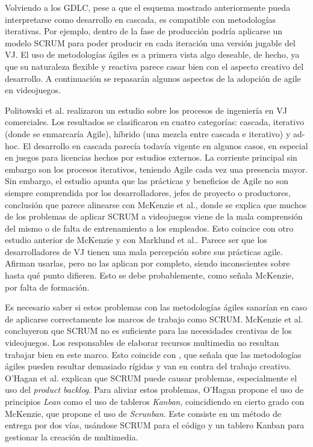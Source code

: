 Volviendo a los GDLC, pese a que el esquema mostrado anteriormente pueda interpretarse como desarrollo en cascada, es compatible con metodologías iterativas. Por ejemplo, dentro de la fase de producción podría aplicarse un modelo SCRUM para poder producir en cada iteración una versión jugable del VJ. El uso de metodologías ágiles es a primera vista algo deseable, de hecho, ya que su naturaleza flexible y reactiva parece casar bien con el aspecto creativo del desarrollo. A continuación se repasarán algunos aspectos de la adopción de agile en videojuegos.

Politowski et al.\cite{politowski} realizaron un estudio sobre los procesos de ingeniería en VJ comerciales. Los resultados se clasificaron en cuatro categorías: cascada, iterativo (donde se enmarcaría Agile), híbrido (una mezcla entre cascada e iterativo) y ad-hoc. El desarrollo en cascada parecía todavía vigente en algunos casos, en especial en juegos para licencias hechos por estudios externos. La corriente principal sin embargo son los procesos iterativos, teniendo Agile cada vez una presencia mayor. Sin embargo, el estudio apunta que las prácticas y beneficios de Agile no son siempre comprendida por los desarrolladores, jefes de proyecto o productores, conclusión que parece alinearse con McKenzie et al.\cite{mckenzie}, donde se explica que muchos de los problemas de aplicar SCRUM a videojuegos viene de la mala comprensión del mismo o de falta de entrenamiento a los empleados. Esto coincice con otro estudio anterior de McKenzie\cite{mckenzie2} y con Marklund et al.\cite{marklund}. Parece ser que los desarrolladores de VJ tienen una mala percepción sobre sus prácticas agile. Afirman usarlas, pero no las aplican por completo, siendo inconscientes sobre hasta qué punto difieren. Esto se debe probablemente, como señala McKenzie\cite{mckenzie}, por falta de formación.

Es necesario saber si estos problemas con las metodologías ágiles sanarían en caso de aplicarse correctamente los marcos de trabajo como SCRUM. McKenzie et al.\cite{mckenzie} concluyeron que SCRUM no es suficiente para las necesidades creativas de los videojuegos. Los responsables de elaborar recursos multimedia no resultan trabajar bien en este marco. Esto coincide con \cite{ENGSTROM201810}, que señala que las metodologías ágiles pueden resultar demasiado rígidas y van en contra del trabajo creativo. O'Hagan et al.\cite{ohagan} explican que SCRUM puede causar problemas, especialmente el uso del \textit{product backlog}. Para aliviar estos problemas, O'Hagan propone el uso de principios \textit{Lean} como el uso de tableros \textit{Kanban}, coincidiendo en cierto grado con McKenzie, que propone el uso de \textit{Scrunban}. Este consiste en un método de entrega por dos vías, usándose SCRUM para el código y un tablero Kanban para gestionar la creación de multimedia.

